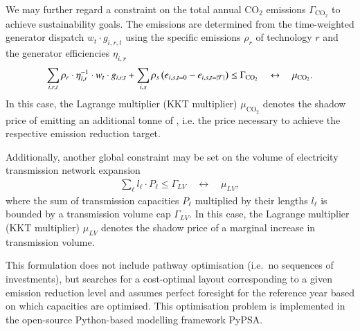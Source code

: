 We may further regard a constraint on the total annual CO$_2$ emissions $\Gamma_{\text{CO}_2}$
to achieve sustainability goals.
The emissions are determined from the time-weighted generator dispatch $ w_t \cdot g_{i,r,t}$ using the specific emissions $\rho_r$ of technology $r$
and the generator efficiencies $\eta_{i,r}$
\begin{align}
	\sum_{i,r,t}  \rho_r \cdot \eta_{i,r}^{-1} \cdot w_t \cdot g_{i,r,t} + \sum_{i,s} \rho_s \left(e_{i,s,t=0} - e_{i,s,t=\left|\mathcal{T}\right|}\right) \leq \Gamma_{\text{CO}_2}  \quad \leftrightarrow \quad \mu_{\text{CO}_2}.
\end{align}
In this case, the Lagrange multiplier (KKT multiplier) $\mu_{\text{CO}_2}$ denotes the shadow price of emitting an additional tonne of \co, i.e. the \co price necessary to achieve the respective \co emission reduction target.

Additionally, another global constraint may be set on the volume of electricity transmission network expansion
\begin{align}
    \sum_\ell l_\ell \cdot P_\ell \leq \Gamma_{LV} \quad \leftrightarrow \quad \mu_{LV},
\end{align}
where the sum of transmission capacities $P_\ell$ multiplied by their lengths $l_\ell$ is bounded by a transmission volume cap
$\Gamma_{LV}$. In this case, the Lagrange multiplier (KKT multiplier) $\mu_{LV}$ denotes the shadow price of a marginal increase in transmission volume.

This formulation does not include pathway optimisation (i.e.~no
sequences of investments), but searches for a cost-optimal layout corresponding
to a given \co emission reduction level and assumes perfect foresight for
the reference year based on which capacities are optimised. This optimisation
problem is implemented in the open-source Python-based modelling framework
PyPSA.
